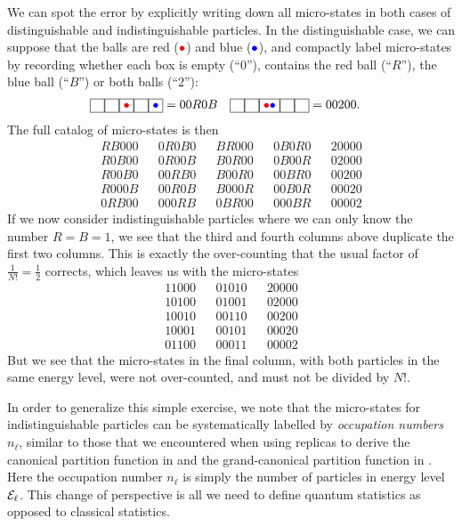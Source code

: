 We can spot the error by explicitly writing down all micro-states in both cases of distinguishable and indistinguishable particles.
In the distinguishable case, we can suppose that the balls are red ($\textcolor{red}{\bullet}$) and blue ($\textcolor{blue}{\bullet}$), and compactly label micro-states by recording whether each box is empty (``$0$''), contains the red ball (``$R$''), the blue ball (``$B$'') or both balls (``$2$''):
\begin{align*}
  \boxzero\boxzero\boxed{\textcolor{red}{\bullet}}\boxzero\boxed{\textcolor{blue}{\bullet}} & = 00R0B &
  \boxzero\boxzero\boxed{\textcolor{red}{\bullet}\textcolor{blue}{\bullet}}\boxzero\boxzero & = 00200.
\end{align*}
The full catalog of micro-states is then
\begin{align*}
  RB000 & & 0R0B0 & & BR000 & & 0B0R0 & & 20000 \\
  R0B00 & & 0R00B & & B0R00 & & 0B00R & & 02000 \\
  R00B0 & & 00RB0 & & B00R0 & & 00BR0 & & 00200 \\
  R000B & & 00R0B & & B000R & & 00B0R & & 00020 \\
  0RB00 & & 000RB & & 0BR00 & & 000BR & & 00002
\end{align*}
If we now consider indistinguishable particles where we can only know the number $R = B = 1$, we see that the third and fourth columns above duplicate the first two columns.
This is exactly the over-counting that the usual factor of $\frac{1}{N!} = \frac{1}{2}$ corrects, which leaves us with the micro-states
\begin{align*}
  11000 & & 01010 & & 20000 \\
  10100 & & 01001 & & 02000 \\
  10010 & & 00110 & & 00200 \\
  10001 & & 00101 & & 00020 \\
  01100 & & 00011 & & 00002
\end{align*}
But we see that the micro-states in the final column, with both particles in the same energy level, were not over-counted, and must not be divided by $N!$.

In order to generalize this simple exercise, we note that the micro-states for indistinguishable particles can be systematically labelled by \textit{occupation numbers} $n_{\ell}$, similar to those that we encountered when using replicas to derive the canonical partition function in  and the grand-canonical partition function in .
Here the occupation number $n_{\ell}$ is simply the number of particles in energy level $\mathcal E_{\ell}$.
This change of perspective is all we need to define quantum statistics as opposed to classical statistics.

